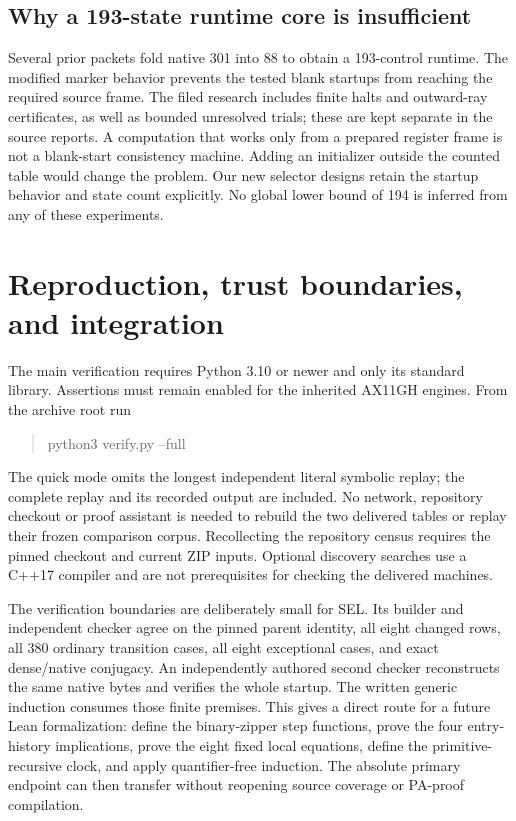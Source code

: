 \documentclass[10pt,letterpaper]{article}
\begin{document}
\subsection{Why a 193-state runtime core is insufficient}

Several prior packets fold native 301 into 88 to obtain a 193-control
runtime. The modified marker behavior prevents the tested blank startups
from reaching the required source frame. The filed research includes
finite halts and outward-ray certificates, as well as bounded unresolved
trials; these are kept separate in the source reports. A computation that
works only from a prepared register frame is not a blank-start consistency
machine. Adding an initializer outside the counted table would change the
problem. Our new selector designs retain the startup behavior and state
count explicitly. No global lower bound of 194 is inferred from any of
these experiments.



\section{Reproduction, trust boundaries, and integration}

The main verification requires Python 3.10 or newer and only its standard
library. Assertions must remain enabled for the inherited AX11GH engines.
From the archive root run
\begin{quote}\ttfamily
python3 verify.py --full
\end{quote}
The quick mode omits the longest independent literal symbolic replay;
the complete replay and its recorded output are included. No network,
repository checkout or proof assistant is needed to rebuild the two
delivered tables or replay their frozen comparison corpus. Recollecting
the repository census requires the pinned checkout and current ZIP inputs.
Optional discovery searches use a C++17 compiler and are not prerequisites
for checking the delivered machines.

The verification boundaries are deliberately small for SEL. Its builder
and independent checker agree on the pinned parent identity, all eight
changed rows, all 380 ordinary transition cases, all eight exceptional
cases, and exact dense/native conjugacy. An independently authored second
checker reconstructs the same native bytes and verifies the whole startup.
The written generic induction consumes those finite premises. This gives
a direct route for a future Lean formalization: define the binary-zipper
step functions, prove the four entry-history implications, prove the eight
fixed local equations, define the primitive-recursive clock, and apply
quantifier-free induction. The absolute primary endpoint can then transfer
without reopening source coverage or PA-proof compilation.
\end{document}
